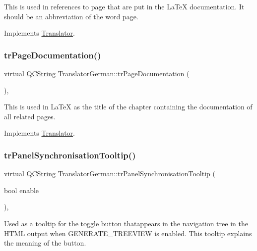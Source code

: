 This is used in references to page that are put in the La\+TeX documentation. It should be an abbreviation of the word page. 

Implements \mbox{\hyperlink{class_translator}{Translator}}.

\mbox{\label{class_translator_german_ab1c8252e385d2876687c7c7fa2bf3c6b}} 
\subsubsection{\texorpdfstring{trPageDocumentation()}{trPageDocumentation()}}
{\footnotesize\ttfamily virtual \mbox{\hyperlink{class_q_c_string}{Q\+C\+String}} Translator\+German\+::tr\+Page\+Documentation (\begin{DoxyParamCaption}{ }\end{DoxyParamCaption})\hspace{0.3cm}{\ttfamily [inline]}, {\ttfamily [virtual]}}

This is used in La\+TeX as the title of the chapter containing the documentation of all related pages. 

Implements \mbox{\hyperlink{class_translator}{Translator}}.

\mbox{\label{class_translator_german_af2a278ea9f46f9e140f0e6f26180eff5}} 
\subsubsection{\texorpdfstring{trPanelSynchronisationTooltip()}{trPanelSynchronisationTooltip()}}
{\footnotesize\ttfamily virtual \mbox{\hyperlink{class_q_c_string}{Q\+C\+String}} Translator\+German\+::tr\+Panel\+Synchronisation\+Tooltip (\begin{DoxyParamCaption}\item[{bool}]{enable }\end{DoxyParamCaption})\hspace{0.3cm}{\ttfamily [inline]}, {\ttfamily [virtual]}}

Used as a tooltip for the toggle button thatappears in the navigation tree in the H\+T\+ML output when G\+E\+N\+E\+R\+A\+T\+E\+\_\+\+T\+R\+E\+E\+V\+I\+EW is enabled. This tooltip explains the meaning of the button. 


